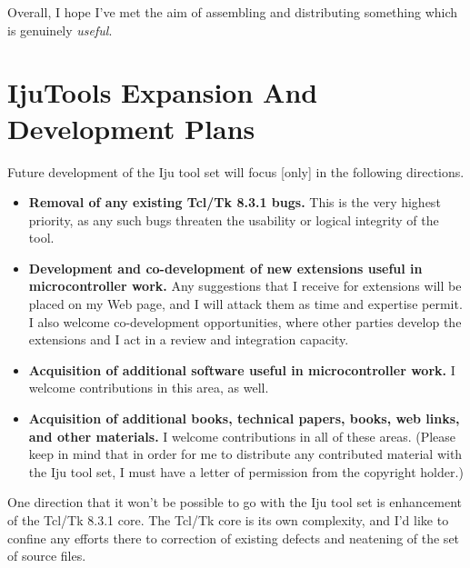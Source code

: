 Overall, I hope I've met the aim of assembling and distributing something which is
genuinely \emph{useful}.


\section{IjuTools Expansion And Development Plans}

Future development of the Iju tool set will focus [only] in the following directions.

\begin{itemize}
\item \textbf{Removal of any existing Tcl/Tk 8.3.1 bugs.}  This is the very 
      highest priority, as any such bugs threaten the usability or 
      logical integrity of the tool.
\item \textbf{Development and co-development of new extensions useful in
      microcontroller work.}  Any suggestions that I receive for
      extensions will be placed on my Web page, and I will attack them as
      time and expertise permit.  I also welcome co-development opportunities,
      where other parties develop the extensions and I act in a review and
      integration capacity.
\item \textbf{Acquisition of additional software useful in microcontroller work.}
      I welcome contributions in this area, as well.
\item \textbf{Acquisition of additional books, technical papers, books, web links, and
      other materials.}  I welcome contributions in all of these areas.  (Please keep in
      mind that in order for me to distribute any contributed material with the Iju
      tool set, I must have a letter of permission from the copyright holder.)
\end{itemize}

One direction that it won't be possible to go with the Iju tool set is enhancement of
the Tcl/Tk 8.3.1 core.  The Tcl/Tk core is its own complexity, and I'd like to confine
any efforts there to correction of existing defects and neatening of the set
of source files.



